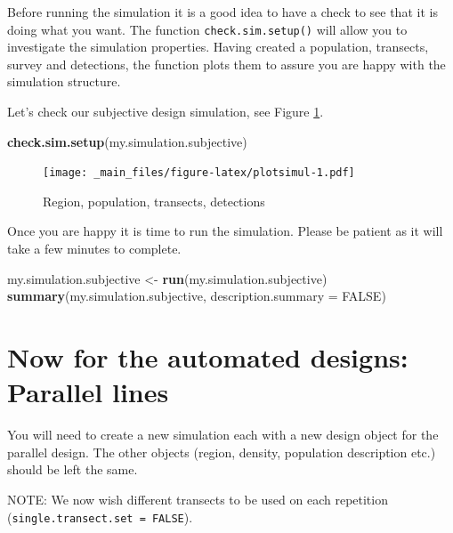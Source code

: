 \documentclass[]{book}
\newenvironment{Shaded}{\begin{snugshade}}{\end{snugshade}}
\newcommand{\KeywordTok}[1]{\textcolor[rgb]{0.13,0.29,0.53}{\textbf{#1}}}
\newcommand{\DataTypeTok}[1]{\textcolor[rgb]{0.13,0.29,0.53}{#1}}
\newcommand{\StringTok}[1]{\textcolor[rgb]{0.31,0.60,0.02}{#1}}
\newcommand{\OtherTok}[1]{\textcolor[rgb]{0.56,0.35,0.01}{#1}}
\newcommand{\NormalTok}[1]{#1}
\theoremstyle{definition}
\theoremstyle{definition}
\theoremstyle{remark}
\begin{document}
Before running the simulation it is a good idea to have a check to see
that it is doing what you want. The function \texttt{check.sim.setup()}
will allow you to investigate the simulation properties. Having created
a population, transects, survey and detections, the function plots them
to assure you are happy with the simulation structure.

Let's check our subjective design simulation, see Figure
\ref{fig:plotsimul}.

\begin{Shaded}
\begin{Highlighting}[]
\KeywordTok{check.sim.setup}\NormalTok{(my.simulation.subjective)}
\end{Highlighting}
\end{Shaded}

\begin{figure}
\centering
\texttt{[image: \_main\_files/figure-latex/plotsimul-1.pdf]}
\caption{\label{fig:plotsimul}Region, population, transects, detections}
\end{figure}

Once you are happy it is time to run the simulation. Please be patient
as it will take a few minutes to complete.

\begin{Shaded}
\begin{Highlighting}[]
\NormalTok{my.simulation.subjective  <-}\StringTok{ }\KeywordTok{run}\NormalTok{(my.simulation.subjective)}
\KeywordTok{summary}\NormalTok{(my.simulation.subjective, }\DataTypeTok{description.summary =} \OtherTok{FALSE}\NormalTok{)}
\end{Highlighting}
\end{Shaded}

\section{Now for the automated designs: Parallel
lines}\label{now-for-the-automated-designs-parallel-lines}

You will need to create a new simulation each with a new design object
for the parallel design. The other objects (region, density, population
description etc.) should be left the same.

NOTE: We now wish different transects to be used on each repetition
(\texttt{single.transect.set\ =\ FALSE}).
\end{document}
